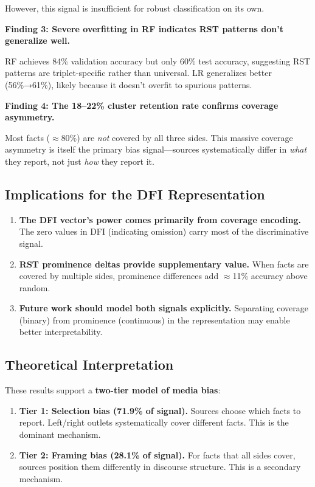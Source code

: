 \documentclass[12pt,a4paper]{article}
\begin{document}
However, this signal is insufficient for robust classification on its own.

\textbf{Finding 3: Severe overfitting in RF indicates RST patterns don't generalize well.}

RF achieves 84\% validation accuracy but only 60\% test accuracy, suggesting RST patterns
are triplet-specific rather than universal. LR generalizes better (56\%→61\%), likely because
it doesn't overfit to spurious patterns.

\textbf{Finding 4: The 18--22\% cluster retention rate confirms coverage asymmetry.}

Most facts ($\approx$80\%) are \textit{not} covered by all three sides. This massive coverage
asymmetry is itself the primary bias signal---sources systematically differ in \textit{what}
they report, not just \textit{how} they report it.

\subsection{Implications for the DFI Representation}

\begin{enumerate}
\item \textbf{The DFI vector's power comes primarily from coverage encoding.} The zero values
      in DFI (indicating omission) carry most of the discriminative signal.

\item \textbf{RST prominence deltas provide supplementary value.} When facts are covered by
      multiple sides, prominence differences add $\approx$11\% accuracy above random.

\item \textbf{Future work should model both signals explicitly.} Separating coverage (binary)
      from prominence (continuous) in the representation may enable better interpretability.
\end{enumerate}

\subsection{Theoretical Interpretation}

These results support a \textbf{two-tier model of media bias}:

\begin{enumerate}
\item \textbf{Tier 1: Selection bias (71.9\% of signal).} Sources choose which facts to report.
      Left/right outlets systematically cover different facts. This is the dominant mechanism.

\item \textbf{Tier 2: Framing bias (28.1\% of signal).} For facts that all sides cover,
      sources position them differently in discourse structure. This is a secondary mechanism.
\end{enumerate}
\end{document}
